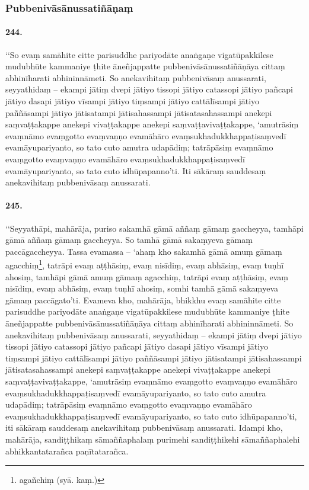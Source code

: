 \subsubsection{Pubbenivāsānussatiñāṇaṃ}

\paragraph{244.} ‘‘So evaṃ samāhite citte parisuddhe pariyodāte anaṅgaṇe vigatūpakkilese mudubhūte kammaniye ṭhite āneñjappatte pubbenivāsānussatiñāṇāya cittaṃ abhinīharati abhininnāmeti. So anekavihitaṃ pubbenivāsaṃ anussarati, seyyathidaṃ – ekampi jātiṃ dvepi jātiyo tissopi jātiyo catassopi jātiyo pañcapi jātiyo dasapi jātiyo vīsampi jātiyo tiṃsampi jātiyo cattālīsampi jātiyo paññāsampi jātiyo jātisatampi jātisahassampi jātisatasahassampi anekepi saṃvaṭṭakappe anekepi vivaṭṭakappe anekepi saṃvaṭṭavivaṭṭakappe, ‘amutrāsiṃ evaṃnāmo evaṃgotto evaṃvaṇṇo evamāhāro evaṃsukhadukkhappaṭisaṃvedī evamāyupariyanto, so tato cuto amutra udapādiṃ; tatrāpāsiṃ evaṃnāmo evaṃgotto evaṃvaṇṇo evamāhāro evaṃsukhadukkhappaṭisaṃvedī evamāyupariyanto, so tato cuto idhūpapanno’ti. Iti sākāraṃ sauddesaṃ anekavihitaṃ pubbenivāsaṃ anussarati.

\paragraph{245.} ‘‘Seyyathāpi, mahārāja, puriso sakamhā gāmā aññaṃ gāmaṃ gaccheyya, tamhāpi gāmā aññaṃ gāmaṃ gaccheyya. So tamhā gāmā sakaṃyeva gāmaṃ paccāgaccheyya. Tassa evamassa – ‘ahaṃ kho sakamhā gāmā amuṃ gāmaṃ agacchiṃ\footnote{agañchiṃ (syā. kaṃ.)}, tatrāpi evaṃ aṭṭhāsiṃ, evaṃ nisīdiṃ, evaṃ abhāsiṃ, evaṃ tuṇhī ahosiṃ, tamhāpi gāmā amuṃ gāmaṃ agacchiṃ, tatrāpi evaṃ aṭṭhāsiṃ, evaṃ nisīdiṃ, evaṃ abhāsiṃ, evaṃ tuṇhī ahosiṃ, somhi tamhā gāmā sakaṃyeva gāmaṃ paccāgato’ti. Evameva kho, mahārāja, bhikkhu evaṃ samāhite citte parisuddhe pariyodāte anaṅgaṇe vigatūpakkilese mudubhūte kammaniye ṭhite āneñjappatte pubbenivāsānussatiñāṇāya cittaṃ abhinīharati abhininnāmeti. So anekavihitaṃ pubbenivāsaṃ anussarati, seyyathidaṃ – ekampi jātiṃ dvepi jātiyo tissopi jātiyo catassopi jātiyo pañcapi jātiyo dasapi jātiyo vīsampi jātiyo tiṃsampi jātiyo cattālīsampi jātiyo paññāsampi jātiyo jātisatampi jātisahassampi jātisatasahassampi anekepi saṃvaṭṭakappe anekepi vivaṭṭakappe anekepi saṃvaṭṭavivaṭṭakappe, ‘amutrāsiṃ evaṃnāmo evaṃgotto evaṃvaṇṇo evamāhāro evaṃsukhadukkhappaṭisaṃvedī evamāyupariyanto, so tato cuto amutra udapādiṃ; tatrāpāsiṃ evaṃnāmo evaṃgotto evaṃvaṇṇo evamāhāro evaṃsukhadukkhappaṭisaṃvedī evamāyupariyanto, so tato cuto idhūpapanno’ti, iti sākāraṃ sauddesaṃ anekavihitaṃ pubbenivāsaṃ anussarati. Idampi kho, mahārāja, sandiṭṭhikaṃ sāmaññaphalaṃ purimehi sandiṭṭhikehi sāmaññaphalehi abhikkantatarañca paṇītatarañca.

